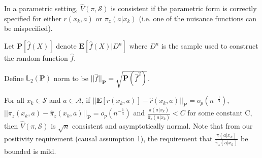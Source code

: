 \begin{corollary}
In a parametric setting, $\widehat{V}(\pi, \mathcal{S})$ is consistent if the parametric form is correctly specified for either $r(x_k,a)$ or $ \pi_{z}(a|x_k)$ (i.e. one of the nuisance functions can be mispecified).
\end{corollary}


\begin{definition}
Let $\mathbf{P}[\widehat{f}(X)]$ denote $\mathbf{E}[\widehat{f}(X) |D^n]$ where  $D^n$ is the sample used to construct the random function $\hat{f}$. %
\end{definition}

\begin{definition}
Define $\mathbb{L}_2(\mathbf{P})$ norm to be $||\hat{f} ||_{\mathbf{P}}=\sqrt{\mathbf{P}(\hat{f}^2)}$.
\end{definition}

\begin{theorem}
For all $x_k \in \mathcal{S}$ and $a \in \mathcal{A}$, if $||\mathbf{E}[r(x_k, a)] - \hat{r}(x_k, a)||_{\mathbf{P}} = o_p(n^{-\frac{1}{4}})$,
\\ $||\pi_z(x_k, a) - \hat{\pi}_z(x_k, a)||_{\mathbf{P}} = o_p(n^{-\frac{1}{4}})$ and $\frac{\pi(a|x_k)}{\hat{\pi}_z(a|x_k)} <  C$ for some constant C, then $\widehat{V}(\pi, \mathcal{S})$ is $\sqrt{n}$ consistent and asymptotically normal. Note that from our positivity requirement (causal assumption 1), the requirement that $\frac{\pi(a|x_k)}{\hat{\pi}_z(a|x_k)}$ be bounded is mild.
\end{theorem}



